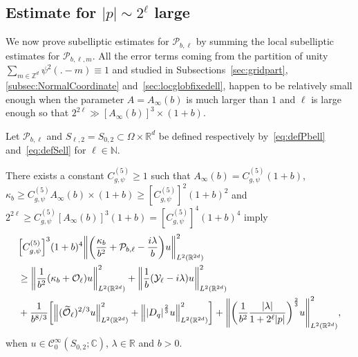 \documentclass[AHL,Unicode,longabstracts]{cedram}
\newcommand{\C}{\mathbb{C}}
\newcommand{\Z}{\mathbb{Z}}
\newcommand{\R}{\mathbb{R}}
\newcommand{\N}{\mathbb{N}}
\newcommand{\clC}{\mathcal{C}}
\newcommand{\clY}{\mathcal{Y}}
\newcommand{\clO}{\mathcal{O}}
\newcommand{\clP}{\mathcal{P}}
\let\oldtilde\tilde
\renewcommand*{\tilde}[1]{\mathchoice{\widetilde{#1}}{\widetilde{#1}}{\oldtilde{#1}}{\oldtilde{#1}}}
\let\originalleft\left
\let\originalright\right
\renewcommand{\left}{\mathopen{}\mathclose\bgroup\originalleft}
\renewcommand{\right}{\aftergroup\egroup\originalright}
\begin{document}
\subsection{Estimate for \texorpdfstring{$|p|\sim 2^{\ell}$}{|p| sim 2\^l} large}\label{subsec:estimateForLargeEll}

We now prove subelliptic estimates for $\clP_{b,\ell}$ by summing the local subelliptic estimates for $\clP_{b,\ell,m}$. All the error terms coming from the partition of unity $\sum_{m\in\Z^{d}}\psi^{2}(.-m)\equiv 1$ and studied in Subsections~\ref{sec:gridpart}, \ref{subsec:NormalCoordinate} and~\ref{sec:locglobfixedell}, happen to be relatively small enough when the parameter $A=A_\infty (b)$ is much larger than $1$ and $\ell$ is large enough so that $2^{2\ell}\gg [A_{\infty}(b)]^3\times (1+b)$.

\begin{prop}\label{pr:subellPbellLarge}
Let $\clP_{b,\ell}$ and $S_{\ell,2}=S_{0,2}\subset \Omega\times \R^{d}$ be defined respectively by~\eqref{eq:defPbell} and~\eqref{eq:defSell} for $\ell\in\N$.

There exists a constant $C_{g,\psi}^{(5)}\geq 1$ such that $A_{\infty}(b)= C_{g,\psi}^{(5)}(1+b)$, $\kappa_{b}\geq C_{g,\psi}^{(5)}A_{\infty}(b)\times (1+b)\geq [C_{g,\psi}^{(5)}]^2(1+b)^2$ and $2^{2\ell}\geq C_{g,\psi}^{(5)}[A_{\infty}(b)]^3(1+b)=[C_{g,\psi}^{(5)}]^{4}(1+b)^4$ imply
\begin{equation}\label{eq:subellPbell}
\begin{aligned}[t]
&\left[C_{g,\psi}^{(5)}\right]^3(1+b)^4
\left\| \left(\frac{\kappa_{b}}{b^{2}} + \clP_{b,\ell} - \frac{i\lambda}{b} \right) u \right\|_{L^2(\R^{2d})}^{2} \\
&\geq \left\| \frac{1}{b^2}\left(\kappa_b+\clO_{\ell}\right) u\right\|_{L^2(\R^{2d})}^2 +
\left\| \frac{1}{b}\left(\clY_{\ell}-i \lambda \right)u \right\|_{L^2(\R^{2d})}^2
\\
&+\frac{1}{b^{8/3}}\left[\left\|(\tilde{\clO}_{\ell})^{2/3} u\right\|_{L^2(\R^{2d})}^2 + \left\|\left|D_{q} \right|^{\frac{2}{3}} u \right\|_{L^2(\R^{{2d}})}^{2}\right]
+ \left\| \left(\frac{1}{b^2} \frac{|\lambda|}{1+2^{\ell}|p|} \right)^{\frac{2}{3}} u \right\|_{L^2(\R^{2d})}^{2},
\end{aligned}
\end{equation}
when $ u \in \clC^\infty_0(S_{0,2};\C)$, $\lambda\in \R$ and $b>0$.
\end{prop}
\end{document}

